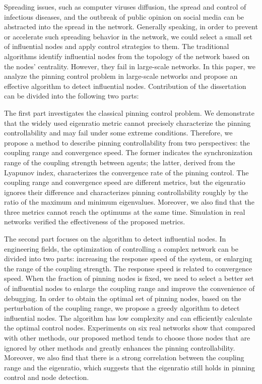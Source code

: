 \begin{abstractEN}
	
Spreading issues, such as computer viruses diffusion, the spread and control of infectious diseases, and the outbreak of public opinion on social media can be abstracted into the spread in the network.
Generally speaking, in order to prevent or accelerate such spreading behavior in the network, we could select a small set of influential nodes and apply control strategies to them.
The traditional algorithms identify influential nodes from the topology of the network based on the nodes' centrality.
However, they fail in large-scale networks.
In this paper, we analyze the pinning control problem in large-scale networks and propose an effective algorithm to detect influential nodes. Contribution of the dissertation can be divided into the following two parts:

The first part investigates the classical pinning control problem.
We demonstrate that the widely used eigenratio metric cannot precisely characterize the pinning controllability and may fail under some extreme conditions. 
Therefore, we propose a method to describe pinning controllability from two perspectives: the coupling range and convergence speed.
The former indicates the synchronization range of the coupling strength between agents; 
the latter, derived from the Lyapunov index, characterizes the convergence rate of the pinning control.
The coupling range and convergence speed are different metrics, but the eigenratio ignores their difference and characterizes pinning controllability roughly by the ratio of the maximum and minimum eigenvalues. 
Moreover, we also find that the three metrics cannot reach the optimums at the same time.
Simulation in real networks verified the effectiveness of the proposed metrics.

The second part focuses on the algorithm to detect influential nodes.
In engineering fields, the optimization of controlling a complex network can be divided into two parts: increasing the response speed of the system, or enlarging the range of the coupling strength.
The response speed is related to convergence speed. 
When the fraction of pinning nodes is fixed, we need to select a better set of influential nodes to enlarge the coupling range and 
improve the convenience of debugging.
In order to obtain the optimal set of pinning nodes, based on the perturbation of the coupling range, we propose a greedy algorithm to detect influential nodes.
The algorithm has low complexity and can efficiently calculate the optimal control nodes.
Experiments on six real networks show that compared with other methods, our proposed method tends to choose those nodes that are ignored by other methods and greatly enhances the pinning controllability.
Moreover, we also find that there is a strong correlation between the coupling range and the  eigenratio, which suggests that the eigenratio still holds in pinning control and node detection.


\end{abstractEN}
